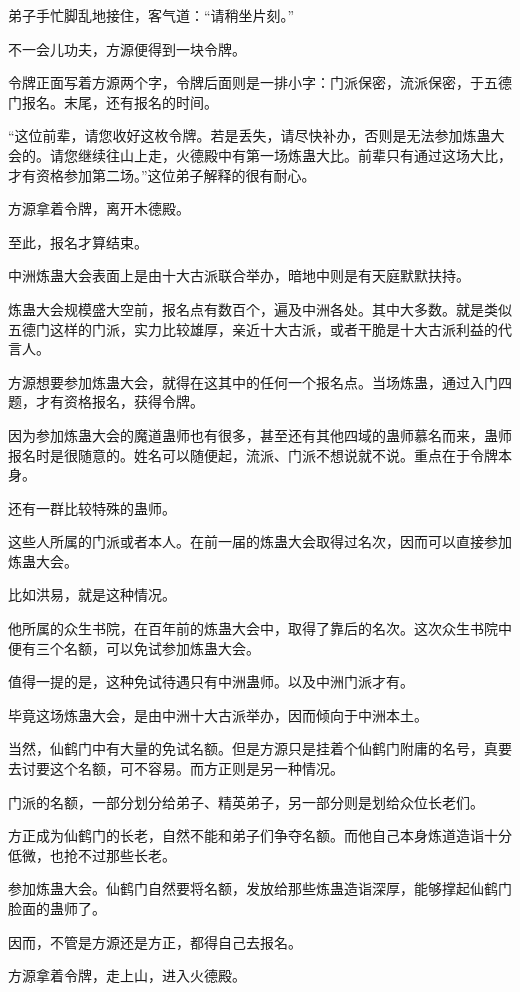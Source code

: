 \begin{this_body}
弟子手忙脚乱地接住，客气道：“请稍坐片刻。”

不一会儿功夫，方源便得到一块令牌。

令牌正面写着方源两个字，令牌后面则是一排小字：门派保密，流派保密，于五德门报名。末尾，还有报名的时间。

“这位前辈，请您收好这枚令牌。若是丢失，请尽快补办，否则是无法参加炼蛊大会的。请您继续往山上走，火德殿中有第一场炼蛊大比。前辈只有通过这场大比，才有资格参加第二场。”这位弟子解释的很有耐心。

方源拿着令牌，离开木德殿。

至此，报名才算结束。

中洲炼蛊大会表面上是由十大古派联合举办，暗地中则是有天庭默默扶持。

炼蛊大会规模盛大空前，报名点有数百个，遍及中洲各处。其中大多数。就是类似五德门这样的门派，实力比较雄厚，亲近十大古派，或者干脆是十大古派利益的代言人。

方源想要参加炼蛊大会，就得在这其中的任何一个报名点。当场炼蛊，通过入门四题，才有资格报名，获得令牌。

因为参加炼蛊大会的魔道蛊师也有很多，甚至还有其他四域的蛊师慕名而来，蛊师报名时是很随意的。姓名可以随便起，流派、门派不想说就不说。重点在于令牌本身。

还有一群比较特殊的蛊师。

这些人所属的门派或者本人。在前一届的炼蛊大会取得过名次，因而可以直接参加炼蛊大会。

比如洪易，就是这种情况。

他所属的众生书院，在百年前的炼蛊大会中，取得了靠后的名次。这次众生书院中便有三个名额，可以免试参加炼蛊大会。

值得一提的是，这种免试待遇只有中洲蛊师。以及中洲门派才有。

毕竟这场炼蛊大会，是由中洲十大古派举办，因而倾向于中洲本土。

当然，仙鹤门中有大量的免试名额。但是方源只是挂着个仙鹤门附庸的名号，真要去讨要这个名额，可不容易。而方正则是另一种情况。

门派的名额，一部分划分给弟子、精英弟子，另一部分则是划给众位长老们。

方正成为仙鹤门的长老，自然不能和弟子们争夺名额。而他自己本身炼道造诣十分低微，也抢不过那些长老。

参加炼蛊大会。仙鹤门自然要将名额，发放给那些炼蛊造诣深厚，能够撑起仙鹤门脸面的蛊师了。

因而，不管是方源还是方正，都得自己去报名。

方源拿着令牌，走上山，进入火德殿。


\end{this_body}
